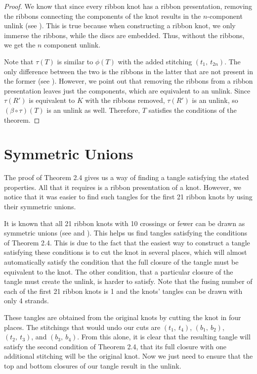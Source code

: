 \documentclass{ws-jktr}
\begin{document}
\begin{proof}
We know that since every ribbon knot has a ribbon presentation, removing the
ribbons connecting the components of the knot results in the $n$-component
unlink (see \figPresentation).
This is true because when constructing a ribbon knot, we only immerse the
ribbons, while the discs are embedded.
Thus, without the ribbons, we get the $n$ component unlink.

Note that $\tau(T)$ is similar to $\phi(T)$ with the added stitching
$(t_1,~t_{2n})$.
The only difference between the two is the ribbons in the latter that are not
present in the former (see \figFinal).
However, we point out that removing the ribbons from a ribbon presentation
leaves just the components, which are equivalent to an unlink.
Since $\tau(R')$ is equivalent to $K$ with the ribbons removed, $\tau(R')$ is an
unlink, so $(\beta\circ\tau)(T)$ is an unlink as well.
Therefore, $T$ satisfies the conditions of the theorem.
\end{proof}

\section{Symmetric Unions}

The proof of Theorem 2.4 gives us a way of finding a tangle satisfying the stated
properties.
All that it requires is a ribbon presentation of a knot.
However, we notice that it was easier to find such tangles for the first 21
ribbon knots by using their symmetric unions.

It is known that all 21 ribbon knots with 10 crossings or fewer can be drawn as
symmetric unions (see \cite{many} and \cite{one}).
This helps us find tangles satisfying the conditions of Theorem 2.4.
This is due to the fact that the easiest way to construct a tangle satisfying
these conditions is to cut the knot in several places, which will almost
automatically satisfy the condition that the full closure of the tangle must be
equivalent to the knot.
The other condition, that a particular closure of the tangle must create the
unlink, is harder to satisfy.
Note that the fusing number of each of the first 21 ribbon knots is 1 and the
knots' tangles can be drawn with only 4 strands.

These tangles are obtained from the original knots by cutting the knot in four
places.
The stitchings that would undo our cuts are $(t_1,~t_4)$, $(b_1,~b_2)$,
$(t_2,~t_3)$, and $(b_3,~b_4)$.
From this alone, it is clear that the resulting tangle will satisfy the second
condition of Theorem 2.4, that its full closure with one additional stitching
will be the original knot.
Now we just need to ensure that the top and bottom closures of our tangle
result in the unlink.
\end{document}
